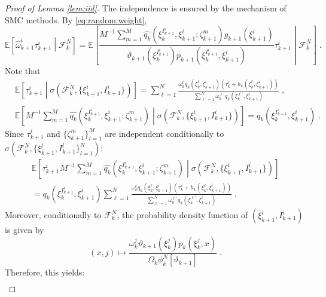 \documentclass[12pt,draft]{article}
\newcommand{\eqsp}{\;}
\newcommand{\1}{\mathrm{1}}
\newcommand{\qk}{q_{k}}
\begin{document}
\begin{proof}[Proof of Lemma \ref{lem:iid}]
The independence is ensured by the mechanism of SMC methods. By \eqref{eq:random:weight},
\[
\mathbb{E}\left[\widehat{\omega}^i_{k+1}\tau^{i}_{k+1}\middle| \mathcal{F}_k^{N}\right] = \mathbb{E}\left[\frac{M^{-1}\sum_{m=1}^M \widehat{\qk}(\xi_{k}^{I^{i}_{k+1}}, \xi^{i}_{k+1};\zeta^m_{k+1})g_{k+1}(\xi^{i}_{k+1})}{\vartheta_{k+1}(\xi^{I^{i}_{k+1}}_{k}) p_{k+1}(\xi_{k}^{I^{i}_{k+1}},\xi^{i}_{k+1})}\tau^{i}_{k+1}\middle| \mathcal{F}_k^{N}\right]\eqsp.
\]
Note that
\begin{align*}
&\mathbb{E}\left[\tau^{i}_{k+1}\middle|\sigma\left(\mathcal{F}_k^{N},\{\xi_{k+1}^i,I_{k+1}^i\}\right)\right]
 = \sum_{\ell=1}^N\frac{\omega_k^{\ell} \qk(\xi_{k}^{\ell}, \xi^{i}_{k+1}) \left(\tau^{\ell}_k + h_{k}(\xi_{k}^{\ell},\xi^{i}_{k+1})\right)}{\sum_{\ell'=1}^N\omega_k^{\ell'} \qk(\xi_{k}^{\ell'},\xi^{i}_{k+1})}\eqsp,\\
&\mathbb{E} \left[ M^{-1}\sum_{m=1}^M \widehat{\qk}(\xi_{k}^{I^{i}_{k+1}},\xi^{i}_{k+1};\zeta^m_{k+1}) \middle| \sigma \left(\mathcal{F}_k^{N},\{\xi_{k+1}^i,I^{i}_{k+1}\}\right)\right]
 = \qk(\xi_{k}^{I^{i}_{k+1}},\xi^{i}_{k+1})\eqsp.
\end{align*}
Since $\tau^{i}_{k+1}$ and $\{\zeta^m_{k+1}\}_{i=1}^M$ are independent conditionally to $\sigma\left(\mathcal{F}_k^{N},\{\xi_{k+1}^l, I_{k+1}^l\}_{l=1}^N\right)$:
\begin{multline*}
\mathbb{E}\left[\tau^{i}_{k+1}M^{-1}\sum_{m=1}^M \widehat{\qk} (\xi_{k}^{I^{i}_{k+1}},\xi^{i}_{k+1};\zeta^m_{k+1})\middle|\sigma\left(\mathcal{F}_k^{N},\{\xi_{k+1}^i,I_{k+1}^i\} \right)\right]\\
 = q_k(\xi_{k}^{I^{i}_{k+1}},\xi^{i}_{k+1})\sum_{\ell=1}^N\frac{\omega_k^{\ell} \qk (\xi_{k}^{\ell},\xi^{i}_{k+1})\left(\tau^{\ell}_k + h_{k}(\xi_{k}^{\ell},\xi^{i}_{k+1})\right)}{\sum_{\ell'=1}^N\omega_k^{\ell'} \qk (\xi_{k}^{\ell'},\xi^{i}_{k+1})}\eqsp.
\end{multline*}
Moreover, conditionally to $\mathcal{F}_k^N$, the probability density function of $(\xi_{k+1}^i,I_{k+1}^i)$ is given by
\[
(x,j) \mapsto \frac{\omega_k^j\vartheta_{k+1}(\xi_k^j)p_k(\xi_k^j,x)}{\Omega_k\phi_k^N[\vartheta_{k+1}]}\eqsp.
\]
Therefore, this yields:
\begin{align*}

\end{align*}
\end{proof}
\end{document}
